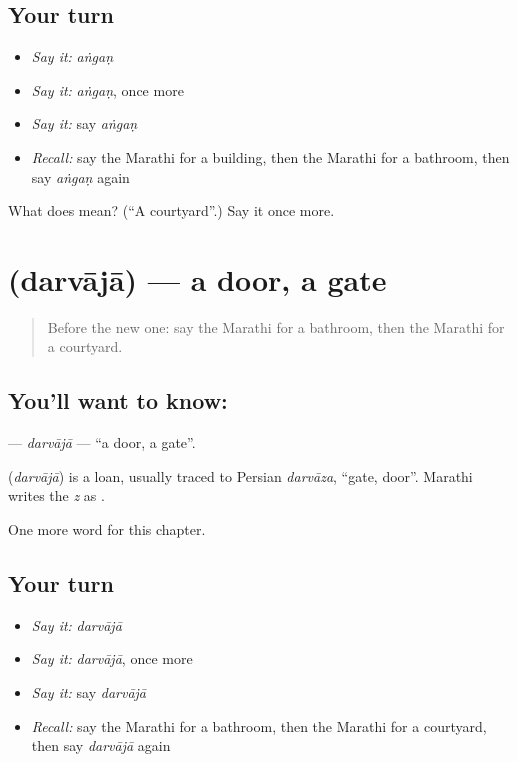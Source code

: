 \subsection*{Your turn}
\begin{itemize}
\raggedright
  \item \emph{Say it:} \emph{aṅgaṇ}
  \item \emph{Say it:} \emph{aṅgaṇ}, once more
  \item \emph{Say it:} say \emph{aṅgaṇ}
  \item \emph{Recall:} say the Marathi for a building, then the Marathi for a bathroom, then say \emph{aṅgaṇ} again
\end{itemize}

\begin{tcolorbox}[breakable,colback=teal!4,colframe=teal!35!black,title={Before you move on}]
What does  mean? (\textquotedblleft{}A courtyard\textquotedblright{}.) Say it once more.
\end{tcolorbox}
\section[\texorpdfstring{\mr{दरवाजा} (darvājā)}{दरवाजा (darvājā)}]{ (darvājā) — a door, a gate}

\label{lesson:MR-C130-darvaja}



\begin{quote}
Before the new one: say the Marathi for a bathroom, then the Marathi for a courtyard.
\end{quote}

\subsection*{You'll want to know: }
\textbf{} — \emph{darvājā} — \textquotedblleft{}a door, a gate\textquotedblright{}.

\begin{cousinweb}
\textbf{} (\emph{darvājā}) is a loan, usually traced to Persian \emph{darvāza}, \textquotedblleft{}gate, door\textquotedblright{}. Marathi writes the \emph{z} as \textbf{}.
\end{cousinweb}

\begin{grammarlens}[title={What you've built}]
One more word for this chapter.
\end{grammarlens}

\subsection*{Your turn}
\begin{itemize}
\raggedright
  \item \emph{Say it:} \emph{darvājā}
  \item \emph{Say it:} \emph{darvājā}, once more
  \item \emph{Say it:} say \emph{darvājā}
  \item \emph{Recall:} say the Marathi for a bathroom, then the Marathi for a courtyard, then say \emph{darvājā} again
\end{itemize}

